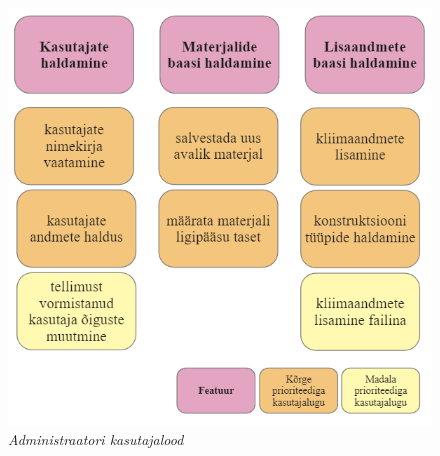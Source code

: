 \begin{figure}[ht]
    \centering
    \includegraphics[width=.7\textwidth]{figures/analysis/admin_userstories.png}
    \caption[Kasutajalood: administraator]{\textit{Administraatori kasutajalood}}
    \label{fig:userstories3}
\end{figure}






